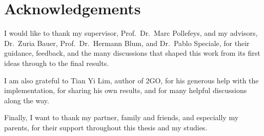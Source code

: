 %

\chapter*{Acknowledgements}

I would like to thank my supervisor, Prof.\ Dr.\ Marc Pollefeys, and my advisors, Dr.\ Zuria Bauer, Prof.\ Dr.\ Hermann Blum, and Dr.\ Pablo Speciale, for their guidance, feedback, and the many discussions that shaped this work from its first ideas through to the final results.

\noindent I am also grateful to Tian Yi Lim, author of 2GO, for his generous help with the implementation, for sharing his own results, and for many helpful discussions along the way.

\noindent Finally, I want to thank my partner, family and friends, and especially my parents, for their support throughout this thesis and my studies.                                                 